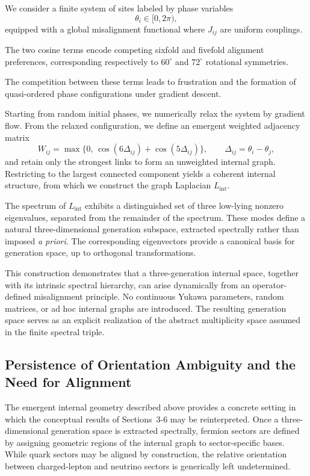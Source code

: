 We consider a finite system of sites labeled by phase variables
\[
\theta_i\in[0,2\pi),
\]
equipped with a global misalignment functional
where $J_{ij}$ are uniform couplings.

The two cosine terms encode competing sixfold and fivefold alignment preferences, corresponding respectively to $60^\circ$ and $72^\circ$ rotational symmetries.

The competition between these terms leads to frustration and the formation of quasi-ordered phase configurations under gradient descent.

Starting from random initial phases, we numerically relax the system by gradient flow. From the relaxed configuration, we define an emergent weighted adjacency matrix
\[
W_{ij}
= \max\{0,\, \cos(6\Delta_{ij}) + \cos(5\Delta_{ij})\},
\qquad
\Delta_{ij} = \theta_i - \theta_j,
\]
and retain only the strongest links to form an unweighted internal graph. Restricting to the largest connected component yields a coherent internal structure, from which we construct the graph Laplacian $L_{\mathrm{int}}$.

The spectrum of $L_{\mathrm{int}}$ exhibits a distinguished set of three low-lying nonzero eigenvalues, separated from the remainder of the spectrum. These modes define a natural three-dimensional generation subspace, extracted spectrally rather than imposed \emph{a priori}. The corresponding eigenvectors provide a canonical basis for generation space, up to orthogonal transformations.

This construction demonstrates that a three-generation internal space, together with its intrinsic spectral hierarchy, can arise dynamically from an operator-defined misalignment principle. No continuous Yukawa parameters, random matrices, or ad hoc internal graphs are introduced. The resulting generation space serves as an explicit realization of the abstract multiplicity space assumed in the finite spectral triple.

\subsection{Persistence of Orientation Ambiguity and the Need for Alignment}

The emergent internal geometry described above provides a concrete setting in which the conceptual results of Sections~3-6 may be reinterpreted. Once a three-dimensional generation space is extracted spectrally, fermion sectors are defined by assigning geometric regions of the internal graph to sector-specific bases. While quark sectors may be aligned by construction, the relative orientation between charged-lepton and neutrino sectors is generically left undetermined.


